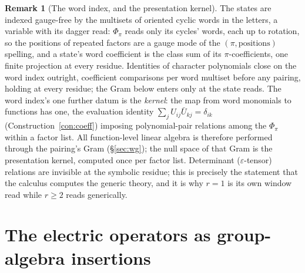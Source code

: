 \documentclass[11pt]{article}
\theoremstyle{definition}
\newtheorem{remark}{Remark}
\begin{document}
\begin{remark}[The word index, and the presentation kernel]
\label{rem:kernel}
The states are indexed gauge-free by the multisets of oriented cyclic
words in the letters, a variable with its dagger read: $\Phi_\pi$
reads only its cycles' words, each
up to rotation, so the positions of repeated factors are a gauge mode of
the $(\pi,\text{positions})$ spelling, and a state's word coefficient is
the class sum of its $\pi$-coefficients, one finite projection at every
residue. Identities of character polynomials close on the word index outright,
coefficient comparisons per word multiset before any pairing, holding at
every residue; the Gram below enters only at the state reads. The word
index's one further datum is the
\emph{kernel}: the map from word monomials to functions has one, the
evaluation identity
$\sum_jU_{ij}\bar U_{kj}=\delta_{ik}$ (Construction~\ref{con:coeff})
imposing polynomial-pair relations among the $\Phi_\pi$ within a factor
list. All function-level linear algebra is
therefore performed through the pairing's Gram (\S\ref{sec:wg}); the null
space of that Gram is the presentation kernel, computed once per
factor list. Determinant ($\varepsilon$-tensor)
relations are invisible at the symbolic residue; this is precisely the statement that the calculus computes the
generic theory, and it is why $r=1$ is its own window read while $r\ge2$ reads
generically.
\end{remark}

\section{The electric operators as group-algebra insertions}
\label{sec:ops}
\end{document}

